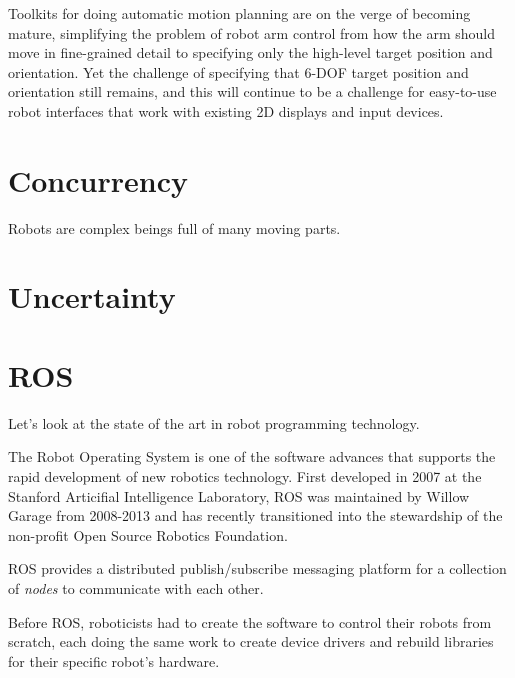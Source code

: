 \documentclass{article}
\begin{document}
Toolkits for doing automatic motion planning are on the verge of becoming mature, simplifying the problem of robot arm control from how the arm should move in fine-grained detail to specifying only the high-level target position and orientation. Yet the challenge of specifying that 6-DOF target position and orientation still remains, and this will continue to be a challenge for easy-to-use robot interfaces that work with existing 2D displays and input devices.

\section{Concurrency}


Robots are complex beings full of many moving parts. 

\section{Uncertainty}






\section{ROS}

Let's look at the state of the art in robot programming technology.


The Robot Operating System is one of the software advances that supports the rapid development of new robotics technology.  First developed in 2007 at the Stanford Articifial Intelligence Laboratory, ROS was maintained by Willow Garage from 2008-2013 and has recently transitioned into the stewardship of the non-profit Open Source Robotics Foundation.

ROS provides a distributed publish/subscribe messaging platform for a collection of {\em nodes} to communicate with each other.

Before ROS, roboticists had to create the software to control their robots from scratch, each doing the same work to create device drivers and rebuild libraries for their specific robot's hardware.
\end{document}
